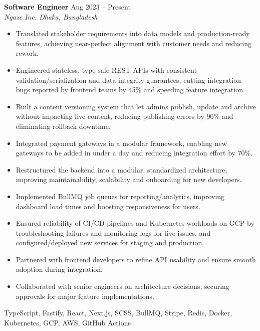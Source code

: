 \documentclass[a4paper,10pt]{article}
\begin{document}
\textbf{Software Engineer} \hfill Aug 2023 -- Present\\[-2pt]
\textit{Ngaze Inc. \textbar{} Dhaka, Bangladesh}\\[-4pt]
\begin{itemize}
  \item Translated stakeholder requirements into data models and production-ready features, achieving near-perfect alignment with customer needs and reducing rework.
  \item Engineered stateless, type-safe REST APIs with consistent validation/serialization and data integrity guarantees, cutting integration bugs reported by frontend teams by 45\% and speeding feature integration.
  \item Built a content versioning system that let admins publish, update and archive without impacting live content, reducing publishing errors by 90\% and eliminating rollback downtime.
  \item Integrated payment gateways in a modular framework, enabling new gateways to be added in under a day and reducing integration effort by 70\%.
  \item Restructured the backend into a modular, standardized architecture, improving maintainability, scalability and onboarding for new developers.
  \item Implemented BullMQ job queues for reporting/analytics, improving dashboard load times and boosting responsiveness for users.
  \item Ensured reliability of CI/CD pipelines and Kubernetes workloads on GCP by troubleshooting failures and monitoring logs for live issues, and configured/deployed new services for staging and production.
  \item Partnered with frontend developers to refine API usability and ensure smooth adoption during integration.
  \item Collaborated with senior engineers on architecture decisions, securing approvals for major feature implementations.
\end{itemize}
{\footnotesize\textsf{TypeScript, Fastify, React, Next.js, SCSS, BullMQ, Stripe, Redis, Docker, Kubernetes, GCP, AWS, GitHub Actions}}

\vspace{2pt}
\end{document}
